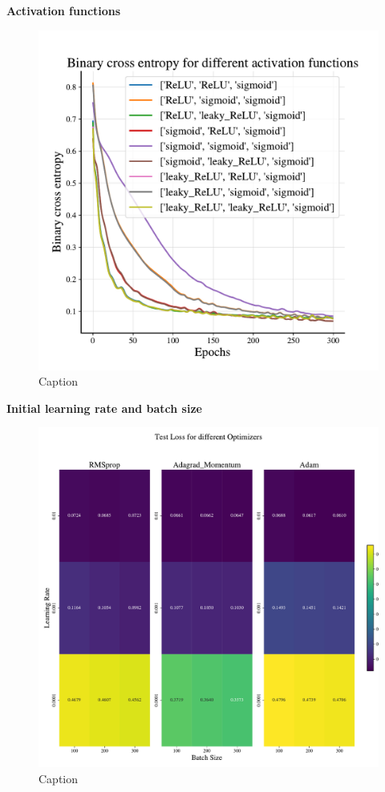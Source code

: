 \textbf{Activation functions}

\begin{figure}
    \centering
    \includegraphics[width=1.0\linewidth]{project_2/figures/Binary cross entropy for different activation functions_classification.pdf}
    \caption{Caption}
    \label{fig:activations_cancer}
\end{figure}

\textbf{Initial learning rate and batch size}

\begin{figure}
    \centering
    \includegraphics[width=1.0\linewidth]{project_2/figures/Loss_grid_classification.pdf}
    \caption{Caption}
    \label{fig:grid_cancer}
\end{figure}

